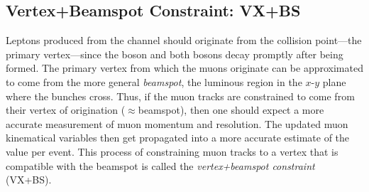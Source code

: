 \subsection{Vertex+Beamspot Constraint: VX+BS}
Leptons produced from the \hzzfourl channel should originate from the \pp collision point---the primary vertex---since the \PH boson and both \PZ bosons decay promptly after being formed.
The primary vertex from which the muons originate can be approximated to come from the more general \emph{beamspot}, \ie the luminous region in the $x$-$y$ plane where the \pp bunches cross.
Thus, if the muon tracks are constrained to come from their vertex of origination ($\approx$beamspot), then one should expect a more accurate measurement of muon momentum and resolution.
The updated muon kinematical variables then get propagated into a more accurate estimate of the \mH value per event.
This process of constraining muon tracks to a vertex that is compatible with the beamspot is called the \emph{vertex+beamspot constraint} (VX+BS).


